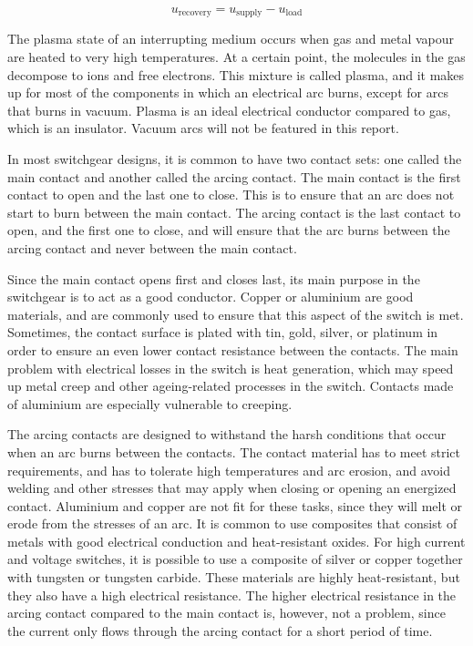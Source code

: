 \documentclass[10pt,b5paper,twoside]{article}
\begin{document}
\begin{equation} \label{eq:U_rec}
u_\mathrm{{recovery}}=u_\mathrm{{supply}}-u_\mathrm{{load}}
\end{equation}  

The plasma state of an interrupting medium occurs when gas and metal vapour are heated to very high temperatures. At a certain point, the molecules in the gas decompose to ions and free electrons. This mixture is called plasma, and it makes up for most of the components in which an electrical arc burns, except for arcs that burns in vacuum. Plasma is an ideal electrical conductor compared to gas, which is an insulator. Vacuum arcs will not be featured in this report.

In most switchgear designs, it is common to have two contact sets: one called the main contact and another called the arcing contact. The main contact is the first contact to open and the last one to close. This is to ensure that an arc does not start to burn between the main contact. The arcing contact is the last contact to open, and the first one to close, and will ensure that the arc burns between the arcing contact and never between the main contact.

Since the main contact opens first and closes last, its main purpose in the switchgear is to act as a good conductor. Copper or aluminium are good materials, and are commonly used to ensure that this aspect of the switch is met. Sometimes, the contact surface is plated with tin, gold, silver, or platinum in order to ensure an even lower contact resistance between the contacts. The main problem with electrical losses in the switch is heat generation, which may speed up metal creep and other ageing-related processes in the switch. Contacts made of aluminium are especially vulnerable to creeping.

The arcing contacts are designed to withstand the harsh conditions that occur when an arc burns between the contacts. The contact material has to meet strict requirements, and has to tolerate high temperatures and arc erosion, and avoid welding and other stresses that may apply when closing or opening an energized contact. Aluminium and copper are not fit for these tasks, since they will melt or erode from the stresses of an arc. It is common to use composites that consist of metals with good electrical conduction and heat-resistant oxides. For high current and voltage switches, it is possible to use a composite of silver or copper together with tungsten or tungsten carbide. These materials are highly heat-resistant, but they also have a high electrical resistance. The higher electrical resistance in the arcing contact compared to the main contact is, however, not a problem, since the current only flows through the arcing contact for a short period of time.
\end{document}
